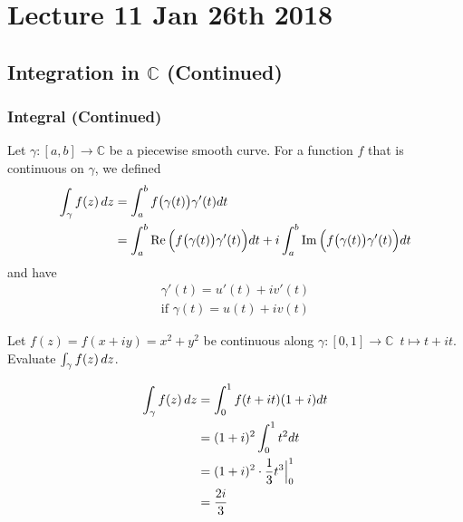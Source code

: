 \documentclass[notoc,notitlepage]{tufte-book}
\begin{document}



\chapter{Lecture 11 Jan 26th 2018}
	\label{chapter:lecture_11_jan_26th_2018}

\section{Integration in \texorpdfstring{$\mathbb{C}$}{C} (Continued)} %
\label{sec:integration_in_c_continued}

\subsection{Integral (Continued)} %
\label{sub:integral_continued}

\begin{note}[Recall]
	Let $\gamma: [a, b] \to \mathbb{C}$ be a piecewise smooth curve. For a function $f$ that is continuous on $\gamma$, we defined
	\begin{align*}
		\int_{\gamma} f(z) \mathop{}\!d{z}
			&= \int_{a}^{b} f\big( \gamma(t) \big) \gamma'(t) dt \\
			&= \int_{a}^{b} \operatorname{Re}\Big(f\big( \gamma(t) \big) \gamma'(t) \Big) dt + i \int_{a}^{b} \operatorname{Im}\Big(f\big( \gamma(t) \big) \gamma'(t) \Big) dt
	\end{align*}
	and have
	\begin{gather*}
		\gamma'(t) = u'(t) + iv'(t) \\
		\text{if } \gamma(t) = u(t) + iv(t)
	\end{gather*}
\end{note}

\begin{eg}
	Let $f(z) = f(x + iy) = x^2 + y^2$ be continuous along $\gamma : [0, 1] \to \mathbb{C} \enspace t \mapsto t + it$. Evaluate $\int_{\gamma} f(z) \mathop{}\!d{z}$.
	\begin{solution}
		\begin{align*}
			\int_{\gamma} f(z) \mathop{}\!d{z}
				&= \int_{0}^{1} f(t + it)(1 + i) dt \\
				&= (1 + i)^2 \int_{0}^{1} t^2 dt \\
				&= (1 + i)^2 \cdot \frac{1}{3} t^3 \Big|_{0}^{1} \\
				&= \frac{2i}{3}
		\end{align*}
	\end{solution}
\end{eg}
\end{document}
